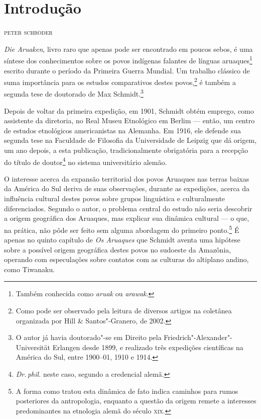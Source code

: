 \pagestyle{plain}

\newcommand{\subtitulo}[1]{\NoCaseChange{\textnormal{\break\Large\itshape#1}}}
\chapter*{Introdução\smallskip\subtitulo{Um clássico da etnologia\\ sul-americanista}}


\begin{flushright}
\textsc{peter schröder}\medskip
\end{flushright}

\noindent{}\textit{Die Aruaken}, livro raro que apenas pode ser encontrado em poucos sebos, é uma síntese dos conhecimentos sobre os povos indígenas falantes de línguas aruaques\footnote{Também conhecida como \textit{aruak} ou \textit{arawak}.} escrito durante o período da Primeira Guerra Mundial. Um trabalho clássico de suma importância para os estudos comparativos destes povos,\footnote{Como pode ser observado pela leitura de diversos artigos na coletânea organizada por Hill \& Santos"-Granero, de 2002.} é também a segunda tese de doutorado de Max Schmidt.\footnote{O autor já havia doutorado"-se em Direito pela Friedrich"-Alexander"-Universität Erlangen desde 1899, e realizado três expedições científicas na América do Sul, entre 1900--01, 1910 e 1914.}

Depois de voltar da primeira expedição, em 1901, Schmidt obtém emprego, como assistente da diretoria, no Real Museu Etnológico em Berlim --- então, um centro de estudos etnológicos americanistas na Alemanha. Em 1916, ele defende sua segunda tese na Faculdade de Filosofia da Universidade de Leipzig que dá origem, um ano depois, a esta publicação, tradicionalmente obrigatória para a recepção do título de doutor\footnote{\textit{Dr.\,phil.} neste caso, segundo a credencial alemã.} no sistema universitário alemão.

O interesse acerca da expansão territorial dos povos Aruaques nas terras baixas da América do Sul deriva de suas observações, durante as expedições, acerca da influência cultural destes povos sobre grupos linguística e culturalmente diferenciados. Segundo o autor, o problema central do estudo não seria descobrir a origem geográfica dos Aruaques, mas explicar sua dinâmica cultural --- o que, na prática, não pôde ser feito sem alguma abordagem do primeiro ponto.\footnote{A forma como tratou esta dinâmica de fato indica caminhos para rumos posteriores da antropologia, enquanto a questão da origem remete a interesses predominantes na etnologia alemã do século \textsc{xix}.} É apenas no quinto capítulo de \textit{Os Aruaques} que Schmidt aventa uma hipótese sobre a possível origem geográfica destes povos no sudoeste da Amazônia, operando com especulações sobre contatos com as culturas do altiplano andino, como Tiwanaku.

